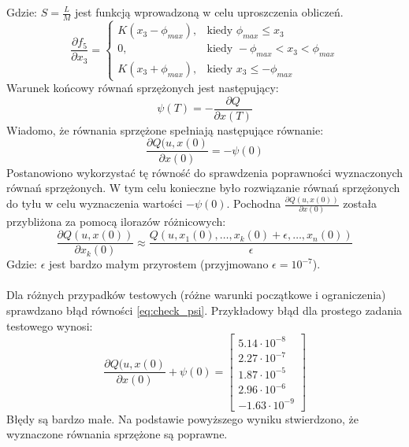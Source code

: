 \noindent Gdzie:\newline
\(S=\frac{L}{M}\) jest funkcją wprowadzoną w celu uproszczenia obliczeń.
\begin{equation}
\frac{\partial f_5}{\partial x_3}=
	\begin{cases}
	K(x_3-\phi_{max}), & \text{kiedy } \phi_{max}\leqslant x_3\\
	0, & \text{kiedy } -\phi_{max}<x_3<\phi_{max}\\
	K(x_3+\phi_{max}), & \text{kiedy } x_3\leqslant -\phi_{max}
	\end{cases}
\end{equation}
Warunek końcowy równań sprzężonych jest następujący:
\begin{equation}
\psi(T)=-\frac{\partial Q}{\partial x(T)}
\end{equation}
Wiadomo, że równania sprzężone spełniają następujące równanie:
\begin{equation}
\frac{\partial Q(u,x(0)}{\partial x(0)}=-\psi(0)
\label{eq:check_psi}
\end{equation}
Postanowiono wykorzystać tę równość do sprawdzenia poprawności wyznaczonych równań sprzężonych. W tym celu konieczne było rozwiązanie równań sprzężonych do tyłu w celu wyznaczenia wartości \(-\psi(0)\). Pochodna \(\frac{\partial Q(u,x(0))}{\partial x(0)}\) została przybliżona za pomocą ilorazów różnicowych:
\begin{equation}
\frac{\partial Q(u,x(0))}{\partial x_k(0)}\approx\frac{Q(u,x_1(0),\dots, x_k(0)+\epsilon,\dots,x_n(0))}{\epsilon}
\end{equation}
\noindent Gdzie:\newline
\(\epsilon\) jest bardzo małym przyrostem (przyjmowano \(\epsilon=10^{-7}\)).
\paragraph*{}
Dla różnych przypadków testowych (różne warunki początkowe i ograniczenia) sprawdzano błąd równości \eqref{eq:check_psi}. Przykładowy błąd dla prostego zadania testowego wynosi:
\begin{equation}
\frac{\partial Q(u,x(0)}{\partial x(0)}+\psi(0)=
\begin{bmatrix}
5.14\cdot 10^{-8}\\
2.27\cdot 10^{-7}\\
1.87\cdot 10^{-5}\\
2.96\cdot 10^{-6}\\
-1.63\cdot 10^{-9}
\end{bmatrix}
\end{equation}
Błędy są bardzo małe. Na podstawie powyższego wyniku stwierdzono, że wyznaczone równania sprzężone są poprawne.